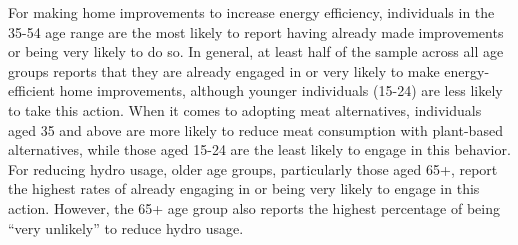 \documentclass[
  letterpaper,
  DIV=11,
  numbers=noendperiod]{scrartcl}
\begin{document}
For making home improvements to increase energy efficiency, individuals
in the 35-54 age range are the most likely to report having already made
improvements or being very likely to do so. In general, at least half of
the sample across all age groups reports that they are already engaged
in or very likely to make energy-efficient home improvements, although
younger individuals (15-24) are less likely to take this action. When it
comes to adopting meat alternatives, individuals aged 35 and above are
more likely to reduce meat consumption with plant-based alternatives,
while those aged 15-24 are the least likely to engage in this behavior.
For reducing hydro usage, older age groups, particularly those aged 65+,
report the highest rates of already engaging in or being very likely to
engage in this action. However, the 65+ age group also reports the
highest percentage of being ``very unlikely'' to reduce hydro usage.

\begin{figure}


\caption{\label{fig-twenty-one}}

\end{figure}%
\end{document}
